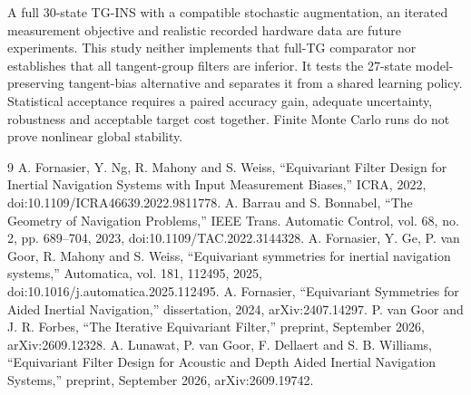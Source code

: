 \documentclass[conference]{IEEEtran}
\begin{document}
A full 30-state TG-INS with a compatible stochastic augmentation, an
iterated measurement objective and realistic recorded hardware data are
future experiments. This study neither implements that full-TG comparator
nor establishes that all tangent-group filters are inferior. It tests the
27-state model-preserving tangent-bias alternative and separates it from a
shared learning policy. Statistical acceptance requires a paired accuracy
gain, adequate uncertainty, robustness and acceptable target cost together.
Finite Monte Carlo runs do not prove nonlinear global stability.

\begin{thebibliography}{9}
 A. Fornasier, Y. Ng, R. Mahony and S. Weiss,
``Equivariant Filter Design for Inertial Navigation Systems with Input
Measurement Biases,'' ICRA, 2022, doi:10.1109/ICRA46639.2022.9811778.
 A. Barrau and S. Bonnabel, ``The Geometry of Navigation
Problems,'' IEEE Trans. Automatic Control, vol. 68, no. 2, pp. 689--704,
2023, doi:10.1109/TAC.2022.3144328.
 A. Fornasier, Y. Ge, P. van Goor, R. Mahony and
S. Weiss, ``Equivariant symmetries for inertial navigation systems,''
Automatica, vol. 181, 112495, 2025, doi:10.1016/j.automatica.2025.112495.
 A. Fornasier, ``Equivariant Symmetries for Aided
Inertial Navigation,'' dissertation, 2024, arXiv:2407.14297.
 P. van Goor and J. R. Forbes, ``The Iterative
Equivariant Filter,'' preprint, September 2026, arXiv:2609.12328.
 A. Lunawat, P. van Goor, F. Dellaert and S. B.
Williams, ``Equivariant Filter Design for Acoustic and Depth Aided Inertial
Navigation Systems,'' preprint, September 2026, arXiv:2609.19742.
\end{thebibliography}
\end{document}
